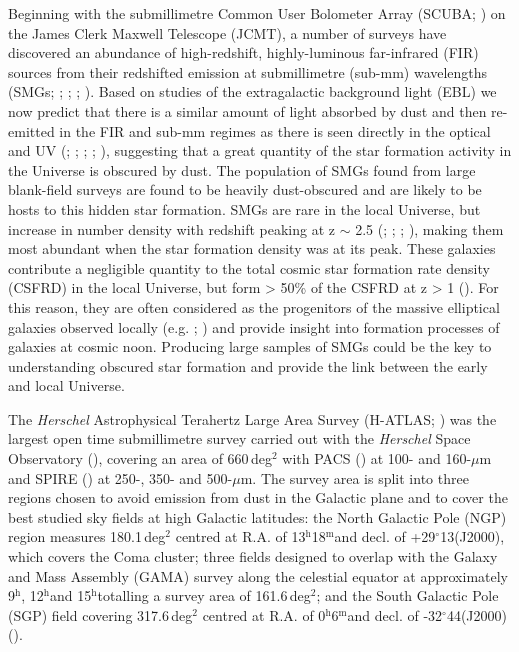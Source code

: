 \documentclass[fleqn,usenatbib]{mnras}
\newcommand{\degrees}{\ensuremath{^\circ}}
\newcommand{\hours}{\ensuremath{^\mathrm{h}}}
\newcommand{\minutes}{\ensuremath{^\mathrm{m}}}
\begin{document}
Beginning with the submillimetre Common User Bolometer Array (SCUBA; \citealt{Holland_1999}) on the James Clerk Maxwell Telescope (JCMT), a number of surveys have discovered an abundance of high-redshift, highly-luminous far-infrared (FIR) sources from their redshifted emission at submillimetre (sub-mm) wavelengths (SMGs; \citealt{Smail_1997}; \citealt{Barger_1998}; \citealt{Hughes_1998}; \citealt{Eales_1999}). Based on studies of the extragalactic background light (EBL) we now predict that there is a similar amount of light absorbed by dust and then re-emitted in the FIR and sub-mm regimes as there is seen directly in the optical and UV (\citealt{Puget_1996}; \citealt{Dwek_1998}; \citealt{Fixsen_1998}; \citealt{Dole_2006}; \citealt{Driver_2008}), suggesting that a great quantity of the star formation activity in the Universe is obscured by dust. The population of SMGs found from large blank-field surveys are found to be heavily dust-obscured and are likely to be hosts to this hidden star formation. SMGs are rare in the local Universe, but increase in number density with redshift peaking at z $\sim$ 2.5 (\citealt{Chapman_2003}; \citealt{Chapman_2005}; \citealt{Wardlow_2011}; \citealt{Casey_2014}), making them most abundant when the star formation density was at its peak. These galaxies contribute a negligible quantity to the total cosmic star formation rate density (CSFRD) in the local Universe, but form > 50\% of the CSFRD at z > 1 (\citealt{Casey_2012}). For this reason, they are often considered as the progenitors of the massive elliptical galaxies observed locally (e.g. \citealt{Toft_2014}; \citealt{Valentino_2020}) and provide insight into formation processes of galaxies at cosmic noon. Producing large samples of SMGs could be the key to understanding obscured star formation and provide the link between the early and local Universe.

The \textit{Herschel} Astrophysical Terahertz Large Area Survey (H-ATLAS; \citealt{Eales_2010}) was the largest open time submillimetre survey carried out with the \textit{Herschel} Space Observatory (\citealt{Pilbratt_2010}), covering an area of 660\,deg$^{2}$ with PACS (\citealt{Poglitsch_2010}) at 100- and 160-$\mu$m and SPIRE (\citealt{Griffin_2010}) at 250-, 350- and 500-$\mu$m. The survey area is split into three regions chosen to avoid emission from dust in the Galactic plane and to cover the best studied sky fields at high Galactic latitudes: the North Galactic Pole (NGP) region measures 180.1\,deg$^{2}$ centred at R.A. of 13\hours 18\minutes and decl. of +29\degrees 13\arcmin (J2000), which covers the Coma cluster; three fields designed to overlap with the Galaxy and Mass Assembly (GAMA) survey along the celestial equator at approximately 9\hours, 12\hours and 15\hours totalling a survey area of 161.6\,deg$^{2}$; and the South Galactic Pole (SGP) field covering 317.6\,deg$^{2}$ centred at R.A. of 0\hours 6\minutes and decl. of -32\degrees 44\arcmin (J2000) (\citealt{Smith_2017}).
\end{document}
